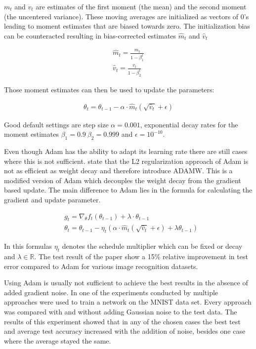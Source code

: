 \documentclass[
a4paper, 
12pt,
grayscalebody, %
abstract=on,
twoside, BCOR10mm, 12pt, DIV13,headinclude, footexclude, final, abstracton, openright
]{ibireprt}
\numberwithin{equation}{chapter}
\numberwithin{table}{chapter}
\numberwithin{figure}{chapter}
\numberwithin{algorithm}{chapter}
\numberwithin{example}{chapter}
\numberwithin{example}{chapter}
\begin{document}
$m_t$ and $v_t$ are estimates of the first moment (the mean) and the second moment (the uncentered
variance). These moving averages are initialized as vectors of 0's leading to moment estimates that are  biased towards zero. The initialization bias can be counteracted resulting in bias-corrected estimates $\hat{m}_t$ and $\hat{v}_t$

\begin{align}
	\hat{m}_t =\frac{m_t}{1- \beta_1^t} \\
	\hat{v}_t = \frac{v_t}{1- \beta_2^t}
\end{align}

Those moment estimates can then be used to update the parameters: 

\begin{align}
	\theta_t = \theta_{t-1}-\alpha\cdot\hat{m}_t(\sqrt{\hat{v}_t}+\epsilon)
\end{align}

Good default settings are step size $\alpha = 0.001$, exponential decay rates for the moment estimates $\beta_1 = 0.9\ \beta_2 = 0.999 $ and $\epsilon =  10^{-10}$.



Even though Adam has the ability to adapt its learning rate there are still cases where this is not sufficient. \cite{Loshchilov2017} state that the L2 regularization approach of Adam is not as efficient as weight decay and therefore introduce ADAMW. This is a modified version of Adam which decouples the weight decay from the gradient based update. The main difference to Adam lies in the formula for calculating the gradient and update parameter. 

\begin{align}
		&g_t  = \nabla_\theta f_t(\theta_{t-1})+\lambda\cdot\theta_{t-1}\\
		&\theta_t = \theta_{t-1}-\eta_t (\alpha\cdot\hat{m}_t(\sqrt{\hat{v}_t}+\epsilon)+\lambda\theta_{t-1})
\end{align}  

In this formulas $\eta_t$ denotes the schedule multiplier which can be fixed or decay and $\lambda \in \mathbb{R}$. The test result of the paper show a 15\% relative improvement in test error compared to Adam for various image recognition datasets.

 
Using Adam is usually not sufficient to achieve the best results in the absence of added gradient noise. In one of the experiments conducted by \cite{Neelakantan2015} multiple approaches were used to train a network on the MNIST data set. Every approach was compared with and without adding Gaussian noise to the test data. The results of this experiment showed that in any of the chosen cases the best test and average test accuracy increased with the addition of noise, besides one case where the average stayed the same. 
\end{document}
